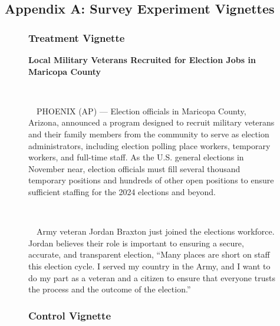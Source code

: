 \documentclass[
  11pt,
  a4paper,
]{scrartcl}
\begin{document}
\pagebreak

\subsection{Appendix A: Survey Experiment
Vignettes}\label{sec-appendix-a}

\begin{figure}

\begin{minipage}{0.50\linewidth}

\subsubsection{Treatment Vignette}\label{treatment-vignette-1}

\textbf{Local Military Veterans Recruited for Election Jobs in Maricopa
County}\\
\strut \\
\strut ~~PHOENIX (AP) --- Election officials in Maricopa County,
Arizona, announced a program designed to recruit military veterans and
their family members from the community to serve as election
administrators, including election polling place workers, temporary
workers, and full-time staff. As the U.S. general elections in November
near, election officials must fill several thousand temporary positions
and hundreds of other open positions to ensure sufficient staffing for
the 2024 elections and beyond.\\
\strut \\
\strut ~~Army veteran Jordan Braxton just joined the elections
workforce. Jordan believes their role is important to ensuring a secure,
accurate, and transparent election, ``Many places are short on staff
this election cycle. I served my country in the Army, and I want to do
my part as a veteran and a citizen to ensure that everyone trusts the
process and the outcome of the election.''

\end{minipage}%
%
\begin{minipage}{0.50\linewidth}

\subsubsection{Control Vignette}\label{control-vignette-1}


\end{minipage}
\end{figure}
\end{document}
